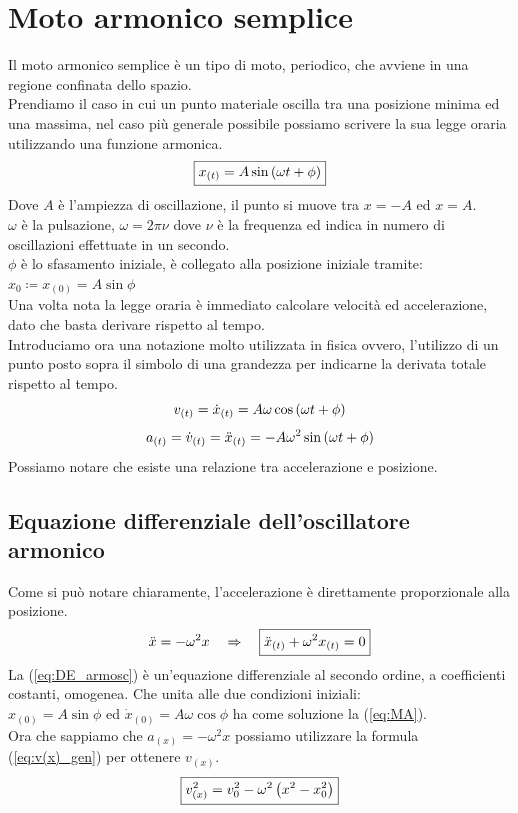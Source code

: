 \section{Moto armonico semplice}
Il moto armonico semplice è un tipo di moto, periodico, che avviene in una
regione confinata dello spazio.\\
Prendiamo il caso in cui un punto materiale oscilla tra una posizione minima
ed una massima, nel caso più generale possibile possiamo scrivere la sua
legge oraria utilizzando una funzione armonica.
\begin{equation}
    \boxed{x_{(t)} = A\sin\left( \omega t +\phi\right)}
\label{eq:MA}
\end{equation}
Dove $A$ è l'ampiezza di oscillazione, il punto si muove tra $ x = -A$ ed
$x = A$.\\
$\omega$ è la pulsazione, $\omega = 2\pi\nu$ dove $\nu$ è la frequenza ed
indica in numero di oscillazioni effettuate in un secondo.\\
$\phi$ è lo sfasamento iniziale, è collegato alla posizione iniziale tramite:
$ x_0 \coloneqq x_{(0)} = A\sin\phi$\\
Una volta nota la legge oraria è immediato calcolare velocità ed accelerazione,
dato che basta derivare rispetto al tempo.\\
Introduciamo ora una notazione molto utilizzata in fisica ovvero, l'utilizzo
di un punto posto sopra il simbolo di una grandezza per indicarne la
derivata totale rispetto al tempo.
\begin{equation}
    v_{(t)} = \dot x_{(t)} = A\omega\cos\left(\omega t +\phi\right)
\label{eq:MA_velocity}
\end{equation}
\begin{equation}
    a_{(t)} = \dot v_{(t)} = \ddot x_{(t)} = -A\omega^2\sin\left(\omega t +\phi\right)
\label{eq:MA_acceleration}
\end{equation}
Possiamo notare che esiste una relazione tra accelerazione e posizione.

\subsection{Equazione differenziale dell'oscillatore armonico}

Come si può notare chiaramente, l'accelerazione è direttamente proporzionale
alla posizione.
\begin{equation}
    \ddot x = -\omega^2x\quad\Rightarrow\quad \boxed{\ddot x_{(t)} + \omega^2x_{(t)} = 0}
\label{eq:DE_armosc}
\end{equation}
La (\ref{eq:DE_armosc}) è un'equazione differenziale al secondo ordine,
a coefficienti costanti, omogenea. Che unita alle due condizioni iniziali:\\
$x_{(0)} = A\sin\phi$ ed $\dot x_{(0)} = A\omega\cos\phi $ ha come soluzione
la (\ref{eq:MA}).\\
Ora che sappiamo che $a_{(x)} = -\omega^2x$ possiamo utilizzare la formula
(\ref{eq:v(x)_gen}) per ottenere $v_{(x)}$.
\begin{equation}
    \boxed{v^2_{(x)} = v_0^2 - \omega^2\left( x^2 - x_0^2\right)}
\label{eq:v(x)_MA}
\end{equation}


